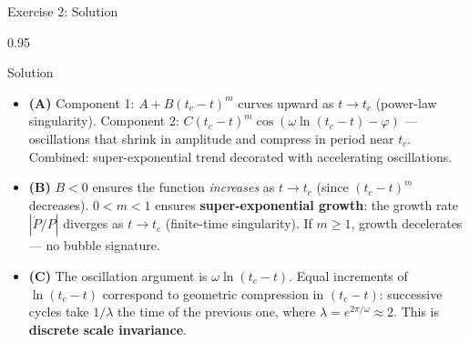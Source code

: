 \documentclass[9pt, aspectratio=169, t]{beamer}
\begin{document}
\begin{frame}{Exercise 2: Solution}
    \begin{cminipage}{0.95\textwidth}
    \begin{exampleblock}{Solution}
        {\small
        \begin{itemize}\setlength{\itemsep}{3pt}
            \item \textcolor{MainBlue}{\textbf{(A)}} Component 1: $A + B(t_c - t)^m$ curves upward as $t \to t_c$ (power-law singularity). Component 2: $C(t_c - t)^m \cos(\omega \ln(t_c - t) - \varphi)$ --- oscillations that shrink in amplitude and compress in period near $t_c$. Combined: super-exponential trend decorated with accelerating oscillations.
            \item \textcolor{MainBlue}{\textbf{(B)}} $B < 0$ ensures the function \emph{increases} as $t \to t_c$ (since $(t_c - t)^m$ decreases). $0 < m < 1$ ensures \textbf{super-exponential growth}: the growth rate $|\dot{P}/P|$ diverges as $t \to t_c$ (finite-time singularity). If $m \geq 1$, growth decelerates --- no bubble signature.
            \item \textcolor{MainBlue}{\textbf{(C)}} The oscillation argument is $\omega \ln(t_c - t)$. Equal increments of $\ln(t_c - t)$ correspond to geometric compression in $(t_c - t)$: successive cycles take $1/\lambda$ the time of the previous one, where $\lambda = e^{2\pi/\omega} \approx 2$. This is \textbf{discrete scale invariance}.
        \end{itemize}
        }
    \end{exampleblock}
    \end{cminipage}
\end{frame}
\end{document}
